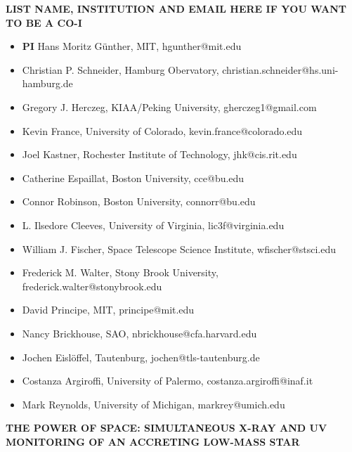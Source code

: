 \documentclass[letterpaper,11pt,twocolumn]{article}
\begin{document}
\onecolumn
\begin{center} 
\bfseries\uppercase{%
List name, institution and email here if you want to be a Co-I
}
\end{center}
\begin{itemize}
    \item \textbf{PI} Hans Moritz G\"unther, MIT, hgunther@mit.edu
    \item Christian P. Schneider, Hamburg Obervatory, christian.schneider@hs.uni-hamburg.de
\item Gregory J. Herczeg, KIAA/Peking University, gherczeg1@gmail.com
\item Kevin France, University of Colorado, kevin.france@colorado.edu
\item Joel Kastner, Rochester Institute of Technology, jhk@cis.rit.edu
\item Catherine Espaillat, Boston University, cce@bu.edu
\item Connor Robinson, Boston University, connorr@bu.edu
\item L. Ilsedore Cleeves, University of Virginia, lic3f@virginia.edu
\item William J. Fischer, Space Telescope Science Institute, wfischer@stsci.edu
\item Frederick M. Walter, Stony Brook University, frederick.walter@stonybrook.edu
\item David Principe, MIT, principe@mit.edu
\item Nancy Brickhouse, SAO, nbrickhouse@cfa.harvard.edu
\item Jochen Eislöffel, Tautenburg, jochen@tls-tautenburg.de
\item Costanza Argiroffi, University of Palermo, costanza.argiroffi@inaf.it
\item Mark Reynolds, University of Michigan, markrey@umich.edu
\end{itemize}

\twocolumn


\pagestyle{plain}


 

\begin{center} 
\bfseries\uppercase{%
The power of space: Simultaneous X-ray and UV monitoring of an accreting
low-mass star
}
\end{center}
\end{document}
